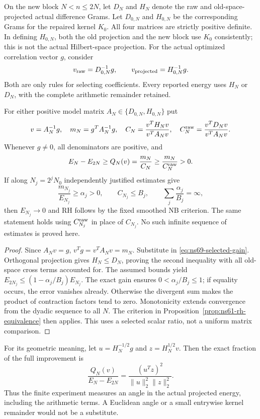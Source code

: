 On the new block $N<n\leq2N$, let $D_N$ and $H_N$ denote the raw
and old-space-projected actual difference Grams. Let $D_{0,N}$ and
$H_{0,N}$ be the corresponding Grams for the repaired kernel $K_0$.
All four matrices are strictly positive definite. In defining $H_{0,N}$,
both the old projection and the new block use $K_0$ consistently;
this is not the actual Hilbert-space projection.
For the actual optimized correlation vector $g$, consider
\[
 v_{\rm raw}=D_{0,N}^{-1}g,\qquad
 v_{\rm projected}=H_{0,N}^{-1}g.
\]
Both are only rules for selecting coefficients. Every reported energy
uses $H_N$ or $D_N$, with the complete arithmetic remainder retained.

\begin{proposition}
\label{prop:ns71-selected-input}
For either positive model matrix $A_N\in\{D_{0,N},H_{0,N}\}$ put
\[
 v=A_N^{-1}g,\quad m_N=g^TA_N^{-1}g,\quad
 C_N=\frac{v^TH_Nv}{v^TA_Nv},\quad
 C_N^{\rm raw}=\frac{v^TD_Nv}{v^TA_Nv}.
\]
Whenever $g\ne0$, all denominators are positive, and
\begin{equation}
 E_N-E_{2N}\geq Q_N(v)=\frac{m_N}{C_N}
                  \geq\frac{m_N}{C_N^{\rm raw}}>0.
 \label{eq:ns71-selected-ratio}
\end{equation}
If along $N_j=2^jN_0$ independently justified estimates give
\[
 \frac{m_{N_j}}{E_{N_j}}\geq\alpha_j>0,
 \qquad C_{N_j}\leq B_j,
 \qquad \sum_j\frac{\alpha_j}{B_j}=\infty,
\]
then $E_{N_j}\to0$ and RH follows by the fixed smoothed NB criterion.
The same statement holds using $C_{N_j}^{\rm raw}$ in place of $C_{N_j}$.
No such infinite sequence of estimates is proved here.
\end{proposition}
\begin{proof}
Since $A_Nv=g$, $v^Tg=v^TA_Nv=m_N$. Substitute in
\eqref{eq:ns69-selected-gain}. Orthogonal projection gives
$H_N\leq D_N$, proving the second inequality with all old-space
cross terms accounted for. The assumed bounds yield
$E_{2N_j}\leq(1-\alpha_j/B_j)E_{N_j}$.
The exact gain ensures $0<\alpha_j/B_j\leq1$; if equality occurs,
the error vanishes already. Otherwise the divergent sum makes the
product of contraction factors tend to zero. Monotonicity extends
convergence from the dyadic sequence to all $N$. The criterion in
Proposition~\ref{prop:ns61-rh-equivalence} then applies.
This uses a selected scalar ratio, not a uniform matrix comparison.
\end{proof}

For its geometric meaning, let $u=H_N^{-1/2}g$ and
$z=H_N^{1/2}v$. Then the exact fraction of the full improvement is
\[
 \frac{Q_N(v)}{E_N-E_{2N}}=
       \frac{(u^Tz)^2}{\|u\|_2^2\|z\|_2^2}.
\]
Thus the finite experiment measures an angle in the actual projected
energy, including the arithmetic terms. A Euclidean angle or a small
entrywise kernel remainder would not be a substitute.

